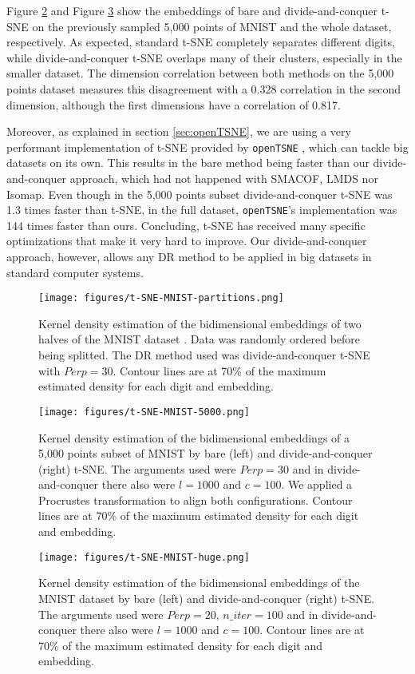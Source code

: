 Figure \ref{fig:t-SNE-MNIST} and Figure \ref{fig:t-SNE-MNIST-huge} show the embeddings of bare and divide-and-conquer t-SNE on the previously sampled 5,000 points of MNIST and the whole dataset, respectively. As expected, standard t-SNE completely separates different digits, while divide-and-conquer t-SNE overlaps many of their clusters, especially in the smaller dataset. The dimension correlation between both methods on the 5,000 points dataset measures this disagreement with a 0.328 correlation in the second dimension, although the first dimensions have a correlation of 0.817.

Moreover, as explained in section \ref{sec:openTSNE}, we are using a very performant implementation of t-SNE provided by \verb|openTSNE| \citep{Policar2024}, which can tackle big datasets on its own. This results in the bare method being faster than our divide-and-conquer approach, which had not happened with SMACOF, LMDS nor Isomap. Even though in the 5,000 points subset divide-and-conquer t-SNE was 1.3 times faster than t-SNE, in the full dataset, \verb|openTSNE|'s implementation was 144 times faster than ours. Concluding, t-SNE has received many specific optimizations that make it very hard to improve. Our divide-and-conquer approach, however, allows any DR method to be applied in big datasets in standard computer systems.

\begin{figure}
    \centering
    \texttt{[image: figures/t-SNE-MNIST-partitions.png]}
    \caption{Kernel density estimation of the bidimensional embeddings of two halves of the MNIST dataset \citep{Cohen2017}. Data was randomly ordered before being splitted. The DR method used was divide-and-conquer t-SNE with $Perp=30$. Contour lines are at 70\% of the maximum estimated density for each digit and embedding.}
    \label{fig:t-SNE-MNIST-partitions}
\end{figure}

\begin{figure}
    \centering
    \texttt{[image: figures/t-SNE-MNIST-5000.png]}
    \caption{Kernel density estimation of the bidimensional embeddings of a 5,000 points subset of MNIST \citep{Cohen2017} by bare (left) and divide-and-conquer (right) t-SNE. The arguments used were $Perp=30$ and in divide-and-conquer there also were $l=1000$ and $c=100$. We applied a Procrustes transformation to align both configurations. Contour lines are at 70\% of the maximum estimated density for each digit and embedding.}
    \label{fig:t-SNE-MNIST}
\end{figure}

\begin{figure}
    \centering
    \texttt{[image: figures/t-SNE-MNIST-huge.png]}
    \caption{Kernel density estimation of the bidimensional embeddings of the MNIST dataset \citep{Cohen2017} by bare (left) and divide-and-conquer (right) t-SNE. The arguments used were $Perp=20, \, n\_iter=100$ and in divide-and-conquer there also were $l=1000$ and $c=100$. Contour lines are at 70\% of the maximum estimated density for each digit and embedding.}
    \label{fig:t-SNE-MNIST-huge}
\end{figure}
